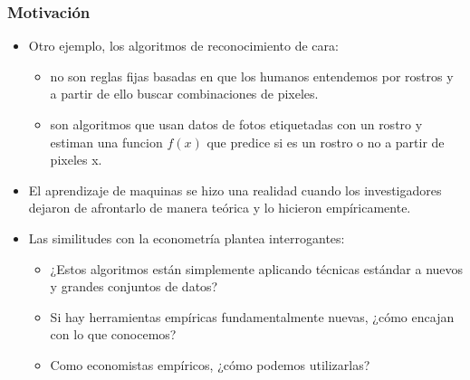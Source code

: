 \documentclass[
  shownotes,
  xcolor={svgnames},
  hyperref={colorlinks,citecolor=DarkBlue,linkcolor=DarkRed,urlcolor=DarkBlue}
  , aspectratio=169]{beamer}
\begin{document}
\begin{frame}
\frametitle{Motivación}

\begin{itemize}
      \item Otro ejemplo, los algoritmos de reconocimiento de cara: 
      \medskip
      \begin{itemize}
        \item no son reglas fijas basadas en que los humanos entendemos por rostros y a partir de ello buscar combinaciones de pixeles.
        \item son algoritmos que usan datos de fotos etiquetadas con un rostro y estiman una funcion $f(x)$ que predice si es un rostro o no a partir de pixeles x.
      \end{itemize}
      \medskip
      \item El aprendizaje de maquinas se hizo una realidad cuando los investigadores dejaron de afrontarlo de manera teórica y lo hicieron empíricamente.
      \medskip
      \item  Las similitudes con la econometría plantea interrogantes:
      \begin{itemize}
      \item  ¿Estos algoritmos están simplemente aplicando técnicas estándar a nuevos y grandes conjuntos de datos? 
      \item  Si hay herramientas empíricas fundamentalmente nuevas, ¿cómo encajan con lo que conocemos? 
      \item  Como economistas empíricos, ¿cómo podemos utilizarlas?
       \end{itemize}
\end{itemize}

\end{frame}

\end{document}
